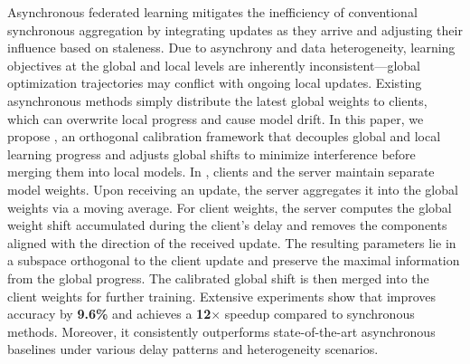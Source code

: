Asynchronous federated learning mitigates the inefficiency of conventional synchronous aggregation by integrating updates as they arrive and adjusting their influence based on staleness. Due to asynchrony and data heterogeneity, learning objectives at the global and local levels are inherently inconsistent---global optimization trajectories may conflict with ongoing local updates. Existing asynchronous methods simply distribute the latest global weights to clients, which can overwrite local progress and cause model drift.
In this paper, we propose \our, an orthogonal calibration framework that decouples global and local learning progress and adjusts global shifts to minimize interference before merging them into local models. In \our, clients and the server maintain separate model weights. Upon receiving an update, the server aggregates it into the global weights via a moving average. For client weights, the server computes the global weight shift accumulated during the client's delay and removes the components aligned with the direction of the received update. The resulting parameters lie in a subspace orthogonal to the client update and preserve the maximal information from the global progress. The calibrated global shift is then merged into the client weights for further training. Extensive experiments show that \our improves accuracy by \textbf{9.6\%} and achieves a \textbf{12$\times$} speedup compared to synchronous methods. Moreover, it consistently outperforms state-of-the-art asynchronous baselines under various delay patterns and heterogeneity scenarios.